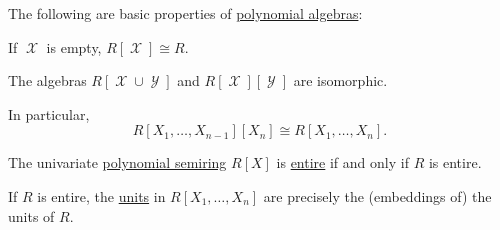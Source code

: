 \begin{proposition}\label{thm:def:polynomial_algebra}
  The following are basic properties of \hyperref[def:polynomial_algebra]{polynomial algebras}:
  \begin{thmenum}
     If \( \mscrX \) is empty, \( R[\mscrX] \cong R \).

     The algebras \( R[\mscrX \cup \mscrY] \) and \( R[\mscrX][\mscrY] \) are isomorphic.

    In particular,
    \begin{equation*}
      R[X_1, \ldots, X_{n-1}][X_n] \cong R[X_1, \ldots, X_n].
    \end{equation*}

     The univariate \hyperref[def:polynomial_algebra]{polynomial semiring} \( R[X] \) is \hyperref[def:entire_semiring]{entire} if and only if \( R \) is entire.

     If \( R \) is entire, the \hyperref[def:divisibility/invertible]{units} in \( R[X_1, \ldots, X_n] \) are precisely the (embeddings of) the units of \( R \).
  \end{thmenum}
\end{proposition}
